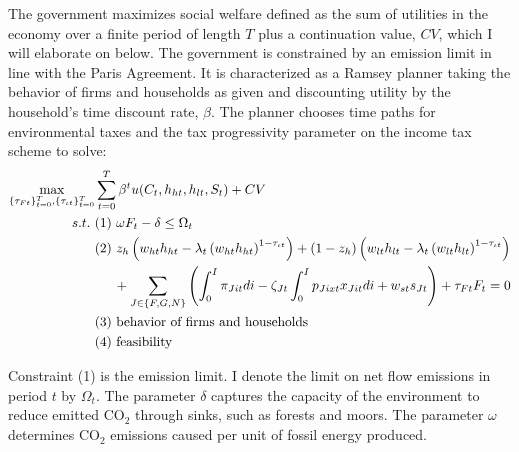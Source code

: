 The government maximizes social welfare defined as the sum of utilities in the economy over a finite period of length $T$ plus a continuation value, $CV$, which I will elaborate on below. The government is constrained by an emission limit in line with the Paris Agreement.  
It is characterized as a Ramsey planner taking the behavior of firms and households as given and discounting utility by the household's time discount rate, $\beta$.
The planner chooses time paths for environmental taxes and the tax progressivity parameter on the income tax scheme to solve:%
\begin{align*}
\underset{\{\tau_{Ft}\}_{t=0}^{T},\{\tau_{\iota t}\}_{t=0}^{T}}{\max}&\sum_{t=0}^{T}\beta^t u(C_{t}, h_{ht}, h_{lt}, S_t)%
+ CV\\
s.t.\ %
& (1)\ \omega F_{t} -\delta \leq \Omega_t %
\\ %
& (2)\ z_h\left(w_{ht}h_{ht}-\lambda_t \left(w_{ht}h_{ht}\right)^{1-\tau_{\iota t}}\right)+(1-z_h)\left(w_{lt}h_{lt}-\lambda_t\left(w_{lt}h_{lt}\right)^{1-\tau_{\iota t}}\right) \\
& \hspace{5mm} +\sum_{J\in\{F,G,N\}}\left(\int_{0}^{I}\pi_{Jit}di-\zeta_{Jt}\int_{0}^{I}p_{Jixt}x_{Jit}di+w_{st}s_{Jt}\right) + \tau_{Ft}F_{t}= 0\\ %
& (3)\ \text{behavior of firms and households}\\
& (4)\ \text{feasibility}
\end{align*}

Constraint (1) is the emission limit. I denote the limit on net flow emissions in period $t$ by $\Omega_t$.  The parameter $\delta$ captures the capacity of the environment to reduce emitted CO$_2$ through sinks, such as forests and moors.  The parameter $\omega$ determines  CO$_2$ emissions caused per unit of fossil energy produced. 

